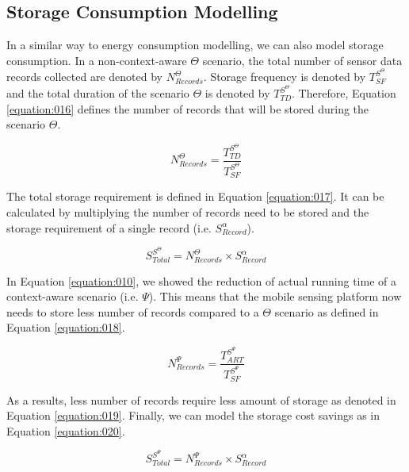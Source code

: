 \documentclass[journal]{IEEEtran}
\begin{document}
\subsection{Storage Consumption Modelling}
\label{sec:Storage}

In a similar  way to energy consumption modelling, we can also model storage consumption. In a non-context-aware $\Theta$ scenario, the total number of sensor data records collected are denoted by $N^{\Theta}_{Records}$. Storage frequency is denoted by $T_{SF}^{S^{\Theta}}$ and the total duration of the scenario $\Theta$  is denoted by $T_{TD}^{S^{\Theta}}$. Therefore, Equation \ref{equation:016} defines the number of records that will be stored during the scenario $\Theta$.


\begin{equation}
\label{equation:016}
N^{\Theta}_{Records} = \frac{T_{TD}^{S^{\Theta}} }{T_{SF}^{S^{\Theta}}  }
\end{equation}

The total storage requirement is defined in Equation \ref{equation:017}. It can be calculated by multiplying the  number of records need to be stored and the storage requirement of a single record (i.e. $S_{Record}^{\alpha}$).

\begin{equation}
\label{equation:017}
S_{Total}^{S^{\Theta}} = N^{\Theta}_{Records} \times S_{Record}^{\alpha }
\end{equation}


In Equation \ref{equation:010}, we showed the reduction of actual running time of a context-aware scenario (i.e. $\Psi$). This means that the mobile sensing platform now needs to store  less number of records compared to a $\Theta$ scenario as defined in Equation \ref{equation:018}.


\begin{equation}
\label{equation:018}
N^{\Psi}_{Records} = \frac{T_{ART}^{S^{\Psi}} }{T_{SF}^{S^{\Psi}}  }
\end{equation}

As a results, less number of records require less amount of storage as denoted in Equation \ref{equation:019}. Finally, we can model the storage cost savings  as  in Equation \ref{equation:020}.

\begin{equation}
\label{equation:019}
S_{Total}^{S^{\Psi}} = N^{\Psi}_{Records}  \times S_{Record}^{\alpha }
\end{equation}
\end{document}

